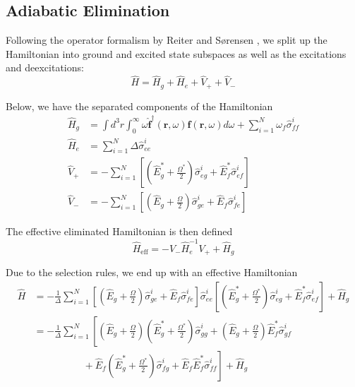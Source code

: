 \documentclass[a4paper, 11pt]{article}
\numberwithin{equation}{section}
\begin{document}
\subsection{Adiabatic Elimination}
Following the operator formalism by Reiter and S\o{}rensen \cite{PhysRevA.85.032111},
we split up the Hamiltonian into ground and excited state subspaces as well as the
excitations and deexcitations:
\begin{equation}
  \hat{H} = \hat{H}_g + \hat{H}_e + \hat{V}_+ + \hat{V}_-
\end{equation}

Below, we have the separated components of the Hamiltonian
\begin{align*}
  \hat{H}_g &= \int d^3r \int_0^\infty \omega \hat{\mathbf{f}}^\dagger (\mathbf{r},
  \omega) \hat{\mathbf{f}}(\mathbf{r}, \omega) d\omega + \sum_{i=1}^N\omega_f
  \hat{\sigma}_{ff}^i\\
  \hat{H}_e &= \sum_{i=1}^N \Delta \hat{\sigma}_{ee}^i\\
  \hat{V}_+ &= -\sum_{i=1}^N \left[\left( \hat{E}_g^* + \frac{\Omega^*}{2}\right)
  \hat{\sigma}_{eg}^i + \hat{E}_f^* \hat{\sigma}_{ef}^i\right]\\
  \hat{V}_- &= -\sum_{i=1}^N \left[\left( \hat{E}_g + \frac{\Omega}{2}\right)
  \hat{\sigma}_{ge}^i + \hat{E}_f \hat{\sigma}_{fe}^i\right]
\end{align*}

The effective eliminated Hamiltonian is then defined
\begin{equation}
  \hat{H}_{\text{eff}} = -V_-  \hat{H}_e^{-1}  V_+ + \hat{H}_g
\end{equation}

Due to the selection rules, we end up with an effective Hamiltonian
\begin{align*}
  \hat{H} &=-\frac{1}{\Delta} \sum_{i=1}^N \left[\left( \hat{E}_g +
  \frac{\Omega}{2}\right) \hat{\sigma}_{ge}^i + \hat{E}_f \hat{\sigma}_{fe}^i\right]
  \hat{\sigma}_{ee}^i \left[\left( \hat{E}_g^* + \frac{\Omega^*}{2}\right)
  \hat{\sigma}_{eg}^i + \hat{E}_f^* \hat{\sigma}_{ef}^i\right] + \hat{H}_g\\
  &= -\frac{1}{\Delta} \sum_{i=1}^N \left[ \left( \hat{E}_g + \frac{\Omega}{2}\right)
  \left( \hat{E}_g^* + \frac{\Omega^*}{2}\right)\hat{\sigma}_{gg}^i +
  \left( \hat{E}_g + \frac{\Omega}{2}\right) \hat{E}_f^*\hat{\sigma}_{gf}^i\right.\\
  &\hspace{5em}+ \left.\hat{E}_f \left( \hat{E}_g^* +
  \frac{\Omega^*}{2}\right)\hat{\sigma}_{fg}^i + \hat{E}_f
  \hat{E}_f^*\hat{\sigma}_{ff}^i\right] + \hat{H}_g\\
\end{align*}
\end{document}
